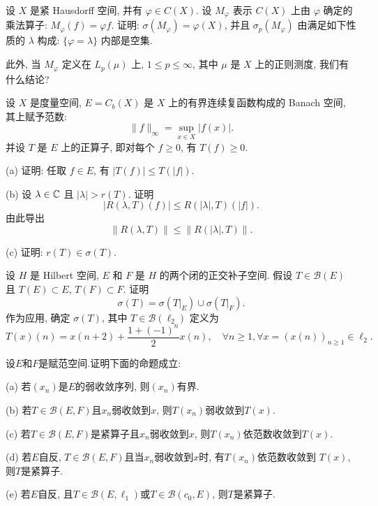 \begin{exercise}
    设 $X$ 是紧 Hausdorff 空间, 并有 $\varphi\in C(X)$.
    设 $M_{\varphi}$ 表示 $C(X)$ 上由 $\varphi$ 确定的乘法算子: $M_{\varphi}(f)=\varphi f$.
    证明: $\sigma(M_{\varphi})=\varphi(X)$, 并且 $\sigma_p(M_{\varphi})$ 由满足如下性质的 $\lambda$ 构成:
    $\{\varphi=\lambda\}$ 内部是空集.

    此外, 当 $M_{\varphi}$ 定义在 $L_p(\mu)$ 上, $1\leq p\leq\infty$, 其中 $\mu$ 是 $X$ 上的正则测度,
    我们有什么结论?
\end{exercise}



\begin{exercise}
    设 $X$ 是度量空间, $E=C_b(X)$ 是 $X$ 上的有界连续复函数构成的 Banach 空间, 其上赋予范数:
    \[\|f\|_{\infty}=\sup_{x\in X}|f(x)|.\]
    并设 $T$ 是 $E$ 上的正算子, 即对每个 $f\geq 0$, 有 $T(f)\geq 0$.

    (a) 证明: 任取 $f\in E$, 有 $|T(f)|\leq T(|f|)$.

    (b) 设 $\lambda\in\mathbb{C}$ 且 $|\lambda|>r(T)$. 证明
    \[|R(\lambda,T)(f)|\leq R(|\lambda|,T)(|f|).\]
    由此导出
    \[\|R(\lambda,T)\|\leq\|R(|\lambda|,T)\|.\]

    (c) 证明: $r(T)\in\sigma(T)$.
\end{exercise}



\begin{exercise}
    设 $H$ 是 Hilbert 空间, $E$ 和 $F$ 是 $H$ 的两个闭的正交补子空间.
    假设 $T\in\mathcal{B}(E)$ 且 $T(E)\subset E$, $T(F)\subset F$. 证明
    \[\sigma(T)=\sigma(T|_E)\cup\sigma(T|_F).\]
    作为应用, 确定 $\sigma(T)$, 其中 $T\in\mathcal{B}(\ell_2)$ 定义为
    \[T(x)(n)=x(n+2)+\frac{1+(-1)^n}{2}x(n),\quad\forall n\geq 1,\forall x=(x(n))_{n\geq 1}\in\ell_2.\]
\end{exercise}



\begin{exercise}
    设$E$和$F$是赋范空间.证明下面的命题成立:

    (a) 若$(x_n)$是$E$的弱收敛序列, 则$(x_n)$有界.

    (b) 若$T\in\mathcal{B}(E,F)$且$x_n$弱收敛到$x$, 则$T(x_n)$弱收敛到$T(x)$.

    (c) 若$T\in\mathcal{B}(E,F)$是紧算子且$x_n$弱收敛到$x$, 则$T(x_n)$依范数收敛到$T(x)$.

    (d) 若$E$自反, $T\in\mathcal{B}(E,F)$且当$x_n$弱收敛到$x$时, 有$T(x_n)$依范数收敛到 $T(x)$, 则$T$是紧算子.

    (e) 若$E$自反, 且$T\in\mathcal{B}(E,\ell_1)$或$T\in\mathcal{B}(c_0,E)$, 则$T$是紧算子. 
\end{exercise}

